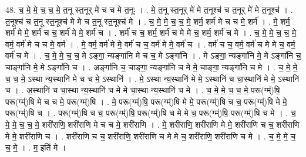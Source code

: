 \documentclass[17pt]{extarticle}
\begin{document}
48. च॒ मे॒ मे॒ च॒ च॒ मे॒ त॒नू स्त॒नूर् मे॑ च च मे त॒नूः । . मे॒ त॒नू स्त॒नूर् मे॑ मे त॒नूश्च॑ च त॒नूर् मे॑ मे त॒नूश्च॑ । . त॒नूश्च॑ च त॒नू स्त॒नूश्च॑ मे मे च त॒नू स्त॒नूश्च॑ मे । . च॒ मे॒ मे॒ च॒ च॒ मे॒ शर्म॒ शर्म॑ मे च च मे॒ शर्म॑ । . मे॒ शर्म॒ शर्म॑ मे मे॒ शर्म॑ च च॒ शर्म॑ मे मे॒ शर्म॑ च । . शर्म॑ च च॒ शर्म॒ शर्म॑ च मे मे च॒ शर्म॒ शर्म॑ च मे । . च॒ मे॒ मे॒ च॒ च॒ मे॒ वर्म॒ वर्म॑ मे च च मे॒ वर्म॑ । . मे॒ वर्म॒ वर्म॑ मे मे॒ वर्म॑ च च॒ वर्म॑ मे मे॒ वर्म॑ च । . वर्म॑ च च॒ वर्म॒ वर्म॑ च मे मे च॒ वर्म॒ वर्म॑ च मे । . च॒ मे॒ मे॒ च॒ च॒ मे ऽङ्गा॒ न्यङ्गा॑नि मे च च॒ मे ऽङ्गा॑नि । . मे ऽङ्गा॒ न्यङ्गा॑नि मे॒ मे ऽङ्गा॑नि च॒ चाङ्गा॑नि मे॒ मे ऽङ्गा॑नि च । . अङ्गा॑नि च॒ चाङ्गा॒ न्यङ्गा॑नि च मे मे॒ चाङ्गा॒ न्यङ्गा॑नि च मे । . च॒ मे॒ मे॒ च॒ च॒ मे॒ ऽस्था न्य॒स्थानि॑ मे च च मे॒ ऽस्थानि॑ । . मे॒ ऽस्था न्य॒स्थानि॑ मे मे॒ ऽस्थानि॑ च चा॒स्थानि॑ मे मे॒ ऽस्थानि॑ च । . अ॒स्थानि॑ च चा॒स्था न्य॒स्थानि॑ च मे मे चा॒स्था न्य॒स्थानि॑ च मे । . च॒ मे॒ मे॒ च॒ च॒ मे॒ परू(ग्म्॑)षि॒ परू(ग्म्॑)षि मे च च मे॒ परू(ग्म्॑)षि । . मे॒ परू(ग्म्॑)षि॒ परू(ग्म्॑)षि मे मे॒ परू(ग्म्॑)षि च च॒ परू(ग्म्॑)षि मे मे॒ परू(ग्म्॑)षि च । . परू(ग्म्॑)षि च च॒ परू(ग्म्॑)षि॒ परू(ग्म्॑)षि च मे मे च॒ परू(ग्म्॑)षि॒ परू(ग्म्॑)षि च मे । . च॒ मे॒ मे॒ च॒ च॒ मे॒ शरी॑राणि॒ शरी॑राणि मे च च मे॒ शरी॑राणि । . मे॒ शरी॑राणि॒ शरी॑राणि मे मे॒ शरी॑राणि च च॒ शरी॑राणि मे मे॒ शरी॑राणि च । . शरी॑राणि च च॒ शरी॑राणि॒ शरी॑राणि च मे मे च॒ शरी॑राणि॒ शरी॑राणि च मे । . च॒ मे॒ मे॒ च॒ च॒ मे॒ । . म॒ इति॑ मे । \newline
\pagebreak
{}
\end{document}
